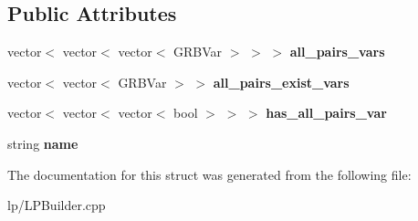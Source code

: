 \subsection*{Public Attributes}
\begin{DoxyCompactItemize}
\item 
\hypertarget{struct_scarab_1_1_h_g_1_1_lattice_vars_a68c89197d9177fd5550b558358e5ac0b}{
vector$<$ vector$<$ vector$<$ GRBVar $>$ $>$ $>$ {\bfseries all\_\-pairs\_\-vars}}
\label{struct_scarab_1_1_h_g_1_1_lattice_vars_a68c89197d9177fd5550b558358e5ac0b}

\item 
\hypertarget{struct_scarab_1_1_h_g_1_1_lattice_vars_a2f4713dd2316790958cdca48bb6a73d1}{
vector$<$ vector$<$ GRBVar $>$ $>$ {\bfseries all\_\-pairs\_\-exist\_\-vars}}
\label{struct_scarab_1_1_h_g_1_1_lattice_vars_a2f4713dd2316790958cdca48bb6a73d1}

\item 
\hypertarget{struct_scarab_1_1_h_g_1_1_lattice_vars_ad6cc2ab5e0d3322d35738ddb0e9af503}{
vector$<$ vector$<$ vector$<$ bool $>$ $>$ $>$ {\bfseries has\_\-all\_\-pairs\_\-var}}
\label{struct_scarab_1_1_h_g_1_1_lattice_vars_ad6cc2ab5e0d3322d35738ddb0e9af503}

\item 
\hypertarget{struct_scarab_1_1_h_g_1_1_lattice_vars_a163eea64436f95f4282590c141f52b1d}{
string {\bfseries name}}
\label{struct_scarab_1_1_h_g_1_1_lattice_vars_a163eea64436f95f4282590c141f52b1d}

\end{DoxyCompactItemize}


The documentation for this struct was generated from the following file:\begin{DoxyCompactItemize}
\item 
lp/LPBuilder.cpp\end{DoxyCompactItemize}
